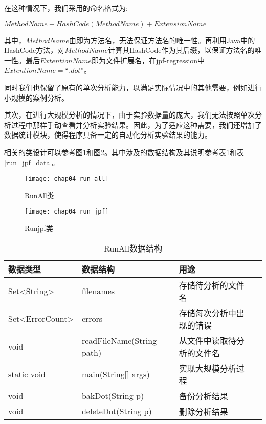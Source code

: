 在这种情况下，我们采用的命名格式为:

$MethodName+HashCode(MethodName)+ExtensionName$

其中，$MethodName$由即为方法名，无法保证方法名的唯一性。再利用Java中的HashCode方法，对$MethodName$计算其HashCode作为其后缀，以保证方法名的唯一性。最后$ExtentionName$即为文件扩展名，在jpf-regression中$ExtentionName = “.dot”$。

同时我们也保留了原有的单次分析能力，以满足实际情况中的其他需要，例如进行小规模的案例分析。

其次，在进行大规模分析的情况下，由于实验数据量的庞大，我们无法按照单次分析过程中那样手动查看并分析实验结果。因此，为了适应这种需要，我们还增加了数据统计模块，使得程序具备一定的自动化分析实验结果的能力。

相关的类设计可以参考图\ref {class_run_all}和图\ref {class_run_jpf}。其中涉及的数据结构及其说明参考表\ref {run_all_data}和表\ref {run_jpf_data}。

\begin{figure}[H]
	\centering
	\texttt{[image: chap04\_run\_all]}
	\caption {RunAll类}
	\label {class_run_all}	
\end{figure}

\begin{figure}[H]
	\centering
	\texttt{[image: chap04\_run\_jpf]}
	\caption {Runjpf类}
	\label {class_run_jpf}	
\end{figure}

\begin{table}
	\caption{RunAll数据结构}
	\label{run_all_data}
	\centering
	\begin{tabular}{lllc}
		\toprule[1.5pt]
		{\heiti 数据类型} &{\heiti 数据结构} & {\heiti 用途} \\\midrule[1pt]
		Set<String> & filenames & 存储待分析的文件名 \\
		Set<ErrorCount> & errors & 存储每次分析中出现的错误 \\
		void & readFileName(String path) & 从文件中读取待分析的文件名\\
		static void & main(String[] args) & 实现大规模分析过程\\
		void & bakDot(String p) & 备份分析结果\\
		void & deleteDot(String p) & 删除分析结果\\
		\bottomrule[1.5pt]
	\end{tabular}
\end{table}

